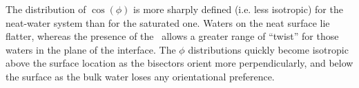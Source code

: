 The distribution of $\cos(\phi)$ is more sharply defined (i.e. less isotropic) for the neat-water system than for the saturated one. Waters on the neat surface lie flatter, whereas the presence of the \suldiox~allows a greater range of ``twist'' for those waters in the plane of the interface. The $\phi$ distributions quickly become isotropic above the surface location as the bisectors orient more perpendicularly, and below the surface as the bulk water loses any orientational preference.


